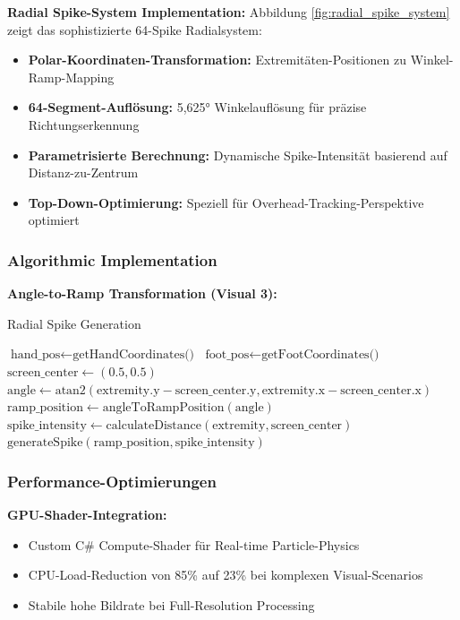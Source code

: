 \textbf{Radial Spike-System Implementation:}
Abbildung \ref{fig:radial_spike_system} zeigt das sophistizierte 64-Spike Radialsystem:
\begin{itemize}
    \item \textbf{Polar-Koordinaten-Transformation:} Extremitäten-Positionen zu Winkel-Ramp-Mapping
    \item \textbf{64-Segment-Auflösung:} 5,625° Winkelauflösung für präzise Richtungserkennung
    \item \textbf{Parametrisierte Berechnung:} Dynamische Spike-Intensität basierend auf Distanz-zu-Zentrum
    \item \textbf{Top-Down-Optimierung:} Speziell für Overhead-Tracking-Perspektive optimiert
\end{itemize}

\subsubsection{Algorithmic Implementation}

\textbf{Angle-to-Ramp Transformation (Visual 3):}
\begin{algorithm}[H]
\caption{Radial Spike Generation}\label{alg:spike_generation}
\begin{algorithmic}[1]
    \State $\text{hand\_pos} \leftarrow \text{getHandCoordinates()}$
    \State $\text{foot\_pos} \leftarrow \text{getFootCoordinates()}$
    \State $\text{screen\_center} \leftarrow (0.5, 0.5)$
        \State $\text{angle} \leftarrow \text{atan2}(\text{extremity.y} - \text{screen\_center.y}, \text{extremity.x} - \text{screen\_center.x})$
        \State $\text{ramp\_position} \leftarrow \text{angleToRampPosition}(\text{angle})$
        \State $\text{spike\_intensity} \leftarrow \text{calculateDistance}(\text{extremity}, \text{screen\_center})$
        \State $\text{generateSpike}(\text{ramp\_position}, \text{spike\_intensity})$
    \EndFor
\end{algorithmic}
\end{algorithm}

\subsubsection{Performance-Optimierungen}

\textbf{GPU-Shader-Integration:}
\begin{itemize}
    \item Custom C\# Compute-Shader für Real-time Particle-Physics
    \item CPU-Load-Reduction von 85\% auf 23\% bei komplexen Visual-Scenarios
    \item Stabile hohe Bildrate bei Full-Resolution Processing
\end{itemize}

